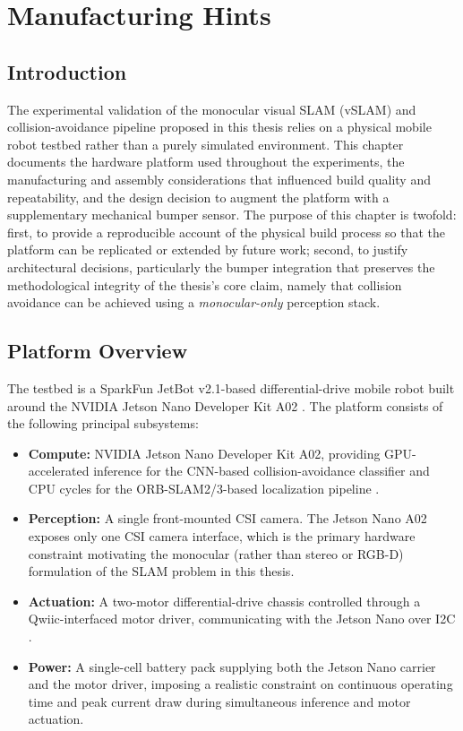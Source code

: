 %
%
%

\chapter{Manufacturing Hints}

\section{Introduction}

The experimental validation of the monocular visual SLAM (vSLAM) and collision-avoidance pipeline proposed in this thesis relies on a physical mobile robot testbed rather than a purely simulated environment. This chapter documents the hardware platform used throughout the experiments, the manufacturing and assembly considerations that influenced build quality and repeatability, and the design decision to augment the platform with a supplementary mechanical bumper sensor. The purpose of this chapter is twofold: first, to provide a reproducible account of the physical build process so that the platform can be replicated or extended by future work; second, to justify architectural decisions, particularly the bumper integration that preserves the methodological integrity of the thesis's core claim, namely that collision avoidance can be achieved using a \emph{monocular-only} perception stack.

\section{Platform Overview}
The testbed is a SparkFun JetBot v2.1-based differential-drive mobile robot built around the NVIDIA Jetson Nano Developer Kit A02 \cite{NVIDIA:2019, JetsonUserManual:2020}. The platform consists of the following principal subsystems:

\begin{itemize}
	\item \textbf{Compute:} NVIDIA Jetson Nano Developer Kit A02, providing GPU-accelerated inference for the CNN-based collision-avoidance classifier and CPU cycles for the ORB-SLAM2/3-based localization pipeline \cite{NVIDIA:2019}.
	\item \textbf{Perception:} A single front-mounted CSI camera. The Jetson Nano A02 exposes only one CSI camera interface, which is the primary hardware constraint motivating the monocular (rather than stereo or RGB-D) formulation of the SLAM problem in this thesis.
	\item \textbf{Actuation:} A two-motor differential-drive chassis controlled through a Qwiic-interfaced motor driver, communicating with the Jetson Nano over I2C \cite{SparkFun:2019b}.
	\item \textbf{Power:} A single-cell battery pack supplying both the Jetson Nano carrier and the motor driver, imposing a realistic constraint on continuous operating time and peak current draw during simultaneous inference and motor actuation.
\end{itemize}

